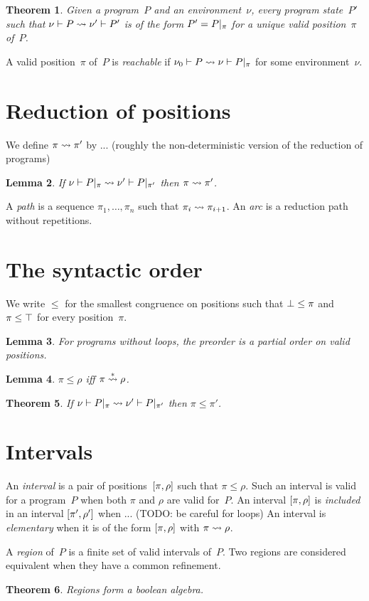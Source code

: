 \documentclass[a4paper]{article}
\theoremstyle{theorem}
\newtheorem{theorem}{Theorem}
\newtheorem{lemma}[theorem]{Lemma}
\theoremstyle{example}
\theoremstyle{remark}
\begin{document}
\begin{theorem}
  Given a program~$P$ and an environment~$\nu$, every program state~$P'$ such
  that $\penv\nu P\redto\penv{\nu'}{P'}$ is of the form $P'=\postate\pi P$ for a
  unique valid position~$\pi$ of~$P$.
\end{theorem}

\noindent
A valid position~$\pi$ of~$P$ is \emph{reachable} if
$\penv{\nu_0} P\redto\penv\nu{\postate\pi P}$ for some environment~$\nu$.

\section{Reduction of positions}
We define $\pi\redto\pi'$ by ... (roughly the non-deterministic version of the
reduction of programs)

\begin{lemma}
  If $\penv\nu{\postate\pi P}\redto\penv{\nu'}{\postate{\pi'}P}$ then
  $\pi\redto\pi'$.
\end{lemma}

\noindent
A \emph{path} is a sequence $\pi_1,\ldots,\pi_n$ such that
$\pi_i\redto\pi_{i+1}$. An \emph{arc} is a reduction path without repetitions.

\section{The syntactic order}
We write $\leq$ for the smallest congruence on positions such that
$\pbot\leq\pi$ and $\pi\leq\ptop$ for every position~$\pi$.

\begin{lemma}
  For programs without loops, the preorder is a partial order on valid
  positions.
\end{lemma}

\begin{lemma}
  $\pi\leq\rho$ iff $\pi\overset*\redto\rho$.
\end{lemma}

\begin{theorem}
  If $\penv\nu{\postate\pi P}\redto\penv{\nu'}{\postate{\pi'}P}$ then
  $\pi\leq\pi'$.
\end{theorem}

\section{Intervals}
An \emph{interval} is a pair of positions~$\intv\pi\rho$ such that
$\pi\leq\rho$. Such an interval is valid for a program~$P$ when both $\pi$ and
$\rho$ are valid for~$P$. An interval $\intv\pi\rho$ is \emph{included} in an
interval $\intv{\pi'}{\rho'}$ when ... (TODO: be careful for loops) An interval
is \emph{elementary} when it is of the form $\intv\pi\rho$ with $\pi\redto\rho$.

A \emph{region} of~$P$ is a finite set of valid intervals of~$P$. Two regions
are considered equivalent when they have a common refinement.

\begin{theorem}
  Regions form a boolean algebra.
\end{theorem}
\end{document}

